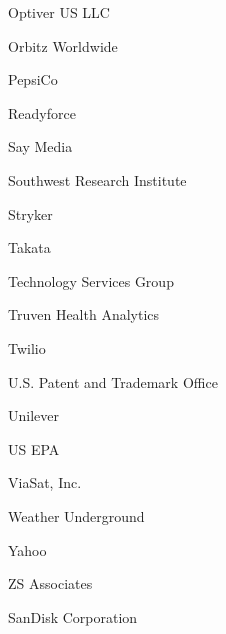 \documentclass[twoside]{article}
\begin{document}
\begin{center}
\begin{multicols}{5}
\begin{FlushLeft}
\begin{compactitem}
\item Optiver US LLC
\item Orbitz Worldwide
\item PepsiCo
\item Readyforce
\item Say Media
\item Southwest Research Institute
\item Stryker
\item Takata
\item Technology Services Group
\item Truven Health Analytics
\item Twilio
\item U.S. Patent and Trademark Office
\item Unilever
\item US EPA
\item ViaSat, Inc.
\item Weather Underground
\item Yahoo
\item ZS Associates
\item SanDisk Corporation
\end{compactitem}
        \end{FlushLeft}
        \vspace{1em}
        \end{multicols}\end{center}
    \newpage
    \startcompanysection
    \startsponsorsection{}
\end{document}
